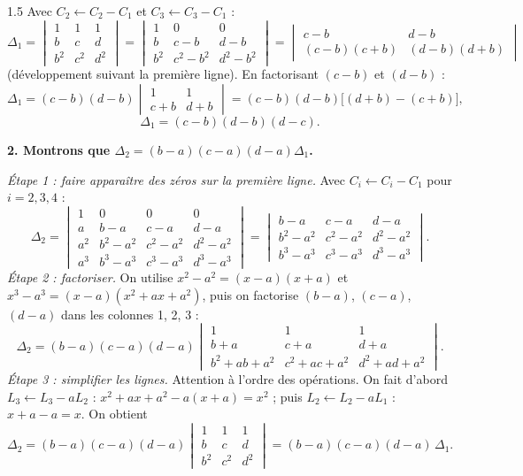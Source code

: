 \documentclass[12pt]{article}
\begin{document}
\begin{spacing}{1.5}
Avec $C_2\leftarrow C_2-C_1$ et $C_3\leftarrow C_3-C_1$ :
\[
\Delta_1=\begin{vmatrix}
1 & 1 & 1\\
b & c & d\\
b^2 & c^2 & d^2
\end{vmatrix}
=\begin{vmatrix}
1 & 0 & 0\\
b & c-b & d-b\\
b^2 & c^2-b^2 & d^2-b^2
\end{vmatrix}
=\begin{vmatrix}
c-b & d-b\\
(c-b)(c+b) & (d-b)(d+b)
\end{vmatrix}
\]
(développement suivant la première ligne). En factorisant $(c-b)$ et $(d-b)$ :
\[
\Delta_1=(c-b)(d-b)\begin{vmatrix}
1 & 1\\
c+b & d+b
\end{vmatrix}=(c-b)(d-b)\big[(d+b)-(c+b)\big],
\]
\[
\boxed{\Delta_1=(c-b)(d-b)(d-c)}.
\]

\textbf{2. Montrons que $\Delta_2=(b-a)(c-a)(d-a)\Delta_1$.}

\emph{Étape 1 : faire apparaître des zéros sur la première ligne.} Avec $C_i\leftarrow C_i-C_1$ pour $i=2,3,4$ :
\[
\Delta_2=\begin{vmatrix}
1 & 0 & 0 & 0 \\
a & b-a & c-a & d-a \\
a^2 & b^2-a^2 & c^2-a^2 & d^2-a^2 \\
a^3 & b^3-a^3 & c^3-a^3 & d^3-a^3
\end{vmatrix}
=\begin{vmatrix}
b-a & c-a & d-a \\
b^2-a^2 & c^2-a^2 & d^2-a^2 \\
b^3-a^3 & c^3-a^3 & d^3-a^3
\end{vmatrix}.
\]
\emph{Étape 2 : factoriser.} On utilise $x^2-a^2=(x-a)(x+a)$ et $x^3-a^3=(x-a)(x^2+ax+a^2)$, puis on factorise $(b-a)$, $(c-a)$, $(d-a)$ dans les colonnes 1, 2, 3 :
\[
\Delta_2=(b-a)(c-a)(d-a)\begin{vmatrix}
1 & 1 & 1 \\
b+a & c+a & d+a \\
b^2+ab+a^2 & c^2+ac+a^2 & d^2+ad+a^2
\end{vmatrix}.
\]
\emph{Étape 3 : simplifier les lignes.} Attention à l'ordre des opérations. On fait d'abord $L_3\leftarrow L_3-aL_2$ : $x^2+ax+a^2-a(x+a)=x^2$ ; puis $L_2\leftarrow L_2-aL_1$ : $x+a-a=x$. On obtient
\[
\Delta_2=(b-a)(c-a)(d-a)\begin{vmatrix}
1 & 1 & 1 \\
b & c & d \\
b^2 & c^2 & d^2
\end{vmatrix}=(b-a)(c-a)(d-a)\,\Delta_1 .
\]


\end{spacing}
\end{document}
